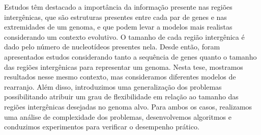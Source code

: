\documentclass[Portugues]{ic-tese-v3}
\theoremstyle{definition}
\theoremstyle{remark}
\theoremstyle{definition}
\begin{document}
\begin{resumo}
Estudos têm destacado a importância da informação presente nas regiões intergênicas, que são estruturas presentes entre cada par de genes e nas extremidades de um genoma, e que podem levar a modelos mais realistas considerando um contexto evolutivo. O tamanho de cada região intergênica é dado pelo número de nucleotídeos presentes nela. Desde então, foram apresentados estudos considerando tanto a sequência de genes quanto o tamanho das regiões intergênicas para representar um genoma. Nesta tese, mostramos resultados nesse mesmo contexto, mas consideramos diferentes modelos de rearranjo. Além disso, introduzimos uma generalização dos problemas possibilitando atribuir um grau de flexibilidade em relação ao tamanho das regiões intergênicas desejadas no genoma alvo. Para ambos os casos, realizamos uma análise de complexidade dos problemas, desenvolvemos algoritmos e conduzimos experimentos para verificar o desempenho prático. 
\end{resumo}
\end{document}

